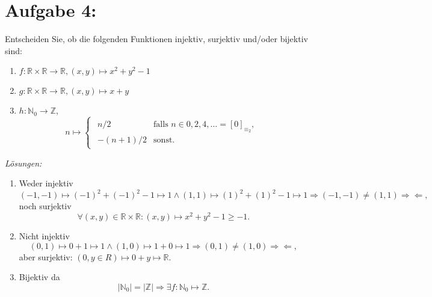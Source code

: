 \documentclass{exam}
\begin{document}
\pagebreak

\section*{Aufgabe 4:}
Entscheiden Sie, ob die folgenden Funktionen injektiv, surjektiv und/oder bijektiv sind:
\begin{enumerate}[label=\roman*)]
	\item $f: \mathbb{R} \times \mathbb{R} \rightarrow \mathbb{R}, (x,y) \mapsto x^2 + y^2 -1$
	\item $g: \mathbb{R} \times \mathbb{R} \rightarrow \mathbb{R}, (x,y) \mapsto x + y$
	\item $h: \mathbb{N}_0 \rightarrow \mathbb{Z}$, \[
		      n \mapsto \left\{
		      \begin{align*}
			      \begin{array}{ll}
				      n/2      & \text{falls } n \in {0,2,4, \dots} = [0]_{\equiv_2}, \\
				      -(n+1)/2 & \text{sonst}.
			      \end{array}
		      \end{align*}
	      \]
\end{enumerate}
\textit{Lösungen:}
\begin{enumerate}[label=\roman*)]
	\item Weder injektiv \[
		      (-1,-1) \mapsto {(-1)}^2 + {(-1)}^2 - 1 \mapsto 1
		      \land
		      (1,1) \mapsto {(1)}^2 + {(1)}^2 - 1 \mapsto 1
		      \Rightarrow
		      (-1,-1) \not = (1,1)
		      \Rightarrow\Leftarrow,
	      \] noch surjektiv \[
		      \forall (x,y) \in \mathbb{R} \times \mathbb{R}: (x,y) \mapsto x^2 + y^2 -1 \ge -1.
	      \]
	\item Nicht injektiv \[
		      (0,1) \mapsto 0 + 1 \mapsto 1
		      \land
		      (1,0) \mapsto 1 + 0 \mapsto 1
		      \Rightarrow
		      (0,1) \not = (1,0)
		      \Rightarrow\Leftarrow,
	      \] aber surjektiv: $(0, y \in R) \mapsto 0 + y \mapsto \mathbb{R}$.
	\item Bijektiv da \[
		      \lvert \mathbb{N}_0 \lvert = \lvert \mathbb{Z} \lvert \Rightarrow \exists f: \mathbb{N}_0 \mapsto \mathbb{Z}.
	      \]
\end{enumerate}
\end{document}

